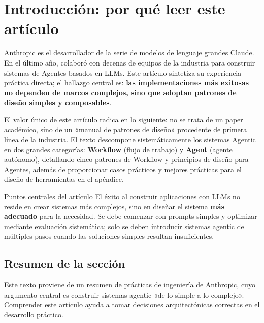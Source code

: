 \section{Introducción: por qué leer este artículo}

Anthropic es el desarrollador de la serie de modelos de lenguaje grandes Claude. En el último año, colaboró con decenas de equipos de la industria para construir sistemas de Agentes basados en LLMs. Este artículo sintetiza su experiencia práctica directa; el hallazgo central es: \textbf{las implementaciones más exitosas no dependen de marcos complejos, sino que adoptan patrones de diseño simples y composables}.

El valor único de este artículo radica en lo siguiente: no se trata de un paper académico, sino de un «manual de patrones de diseño» procedente de primera línea de la industria. El texto descompone sistemáticamente los sistemas Agentic en dos grandes categorías: \textbf{Workflow} (flujo de trabajo) y \textbf{Agent} (agente autónomo), detallando cinco patrones de Workflow y principios de diseño para Agentes, además de proporcionar casos prácticos y mejores prácticas para el diseño de herramientas en el apéndice.

\begin{importantbox}{Puntos centrales del artículo}
El éxito al construir aplicaciones con LLMs no reside en crear sistemas más complejos, sino en diseñar el sistema \textbf{más adecuado} para la necesidad. Se debe comenzar con prompts simples y optimizar mediante evaluación sistemática; solo se deben introducir sistemas agentic de múltiples pasos cuando las soluciones simples resultan insuficientes.
\end{importantbox}

\subsection{Resumen de la sección}
Este texto proviene de un resumen de prácticas de ingeniería de Anthropic, cuyo argumento central es construir sistemas agentic «de lo simple a lo complejo». Comprender este artículo ayuda a tomar decisiones arquitectónicas correctas en el desarrollo práctico.
